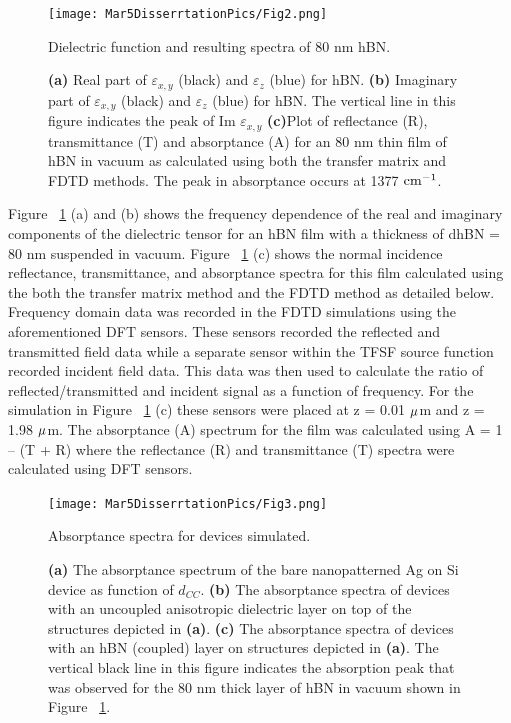 \documentclass[
reprint,
amsmath,amssymb,
aip,
jap,
floatfix,
]{revtex4-2}
\begin{document}
      \begin{figure}[!htb]
        \centering\texttt{[image: Mar5DisserrtationPics/Fig2.png]}
        \caption{Dielectric function and resulting spectra of 80 nm hBN.}
        \caption*{\textbf{(a)} Real part of $\varepsilon_{x,y}$ (black) and $\varepsilon_{z}$ (blue) for hBN. \textbf{(b)} Imaginary part of $\varepsilon_{x,y}$ (black) and $\varepsilon_{z}$ (blue) for hBN. The vertical line in this figure indicates the peak of Im $\varepsilon_{x,y}$ \textbf{(c)}Plot of reflectance (R), transmittance (T) and absorptance (A) for an 80 nm thin film of hBN in vacuum as calculated using both the transfer matrix and FDTD methods. The peak in absorptance occurs at 1377 $\rm cm^{-1}$.}
        \label{fig:2}
      \end{figure}

    Figure ~\ref{fig:2} (a) and (b) shows the frequency dependence of the real and imaginary components of the dielectric tensor for an hBN film with a thickness of dhBN = 80 nm suspended in vacuum. Figure ~\ref{fig:2} (c) shows the normal incidence reflectance, transmittance, and absorptance spectra for this film calculated using the both the transfer matrix method and the FDTD method as detailed below. Frequency domain data was recorded in the FDTD simulations using the aforementioned DFT sensors. These sensors recorded the reflected and transmitted field data while a separate sensor within the TFSF source function recorded incident field data. This data was then used to calculate the ratio of reflected/transmitted and incident signal as a function of frequency. For the simulation in Figure ~\ref{fig:2} (c) these sensors were placed at z = 0.01 $\rm \mu$m and z = 1.98 $\rm \mu$m. The absorptance (A) spectrum for the film was calculated using A = 1 – (T + R) where the reflectance (R) and transmittance (T) spectra were calculated using DFT sensors.
    \\

      \begin{figure}[!htb]
        \centering\texttt{[image: Mar5DisserrtationPics/Fig3.png]}
        \caption{Absorptance spectra for devices simulated.}
        \caption*{\textbf{(a)} The absorptance spectrum of the bare nanopatterned Ag on Si device as function of $d_{CC}$. \textbf{(b)} The absorptance spectra of devices with an uncoupled anisotropic dielectric layer on top of the structures depicted in \textbf{(a)}. \textbf{(c)} The absorptance spectra of devices with an hBN (coupled) layer on structures depicted in \textbf{(a)}. The vertical black line in this figure indicates the absorption peak that was observed for the 80 nm thick layer of hBN in vacuum shown in Figure ~\ref{fig:2}.}
        \label{fig:3}
      \end{figure}
\end{document}
